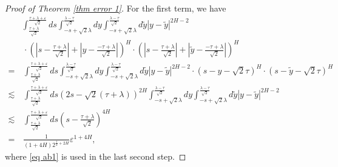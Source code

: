 \documentclass[11pt,reqno]{amsart}
\numberwithin{equation}{section}
\newcommand{\1}{{\bf 1}}
\newcommand{\2}{{\bf 2}}
\begin{document}
\begin{proof}[Proof of Theorem \ref{thm error 1}]
For the first term, we have
\begin{align*}
 & \int_{\frac{\tau+\lambda}{\sqrt 2} }^ \frac{\tau+\lambda+\varepsilon}{\sqrt 2}ds   \int_{-s + \sqrt{2}\lambda}^{\frac{\lambda-\tau}{\sqrt 2} } dy \int_{-s + \sqrt{2}\lambda}^{\frac{\lambda-\tau}{\sqrt 2} } d\tilde{y} 
  |y - \tilde{y}|^{2H-2} \\
  &\, \cdot \left( \left|s - \frac{\tau+\lambda}{\sqrt{2}} \right| + \left| y - \frac{-\tau+\lambda}{\sqrt{2}} \right| \right)^{H} 
  \cdot \left( \left| s - \frac{\tau+\lambda}{\sqrt{2}} \right| + \left| \tilde y - \frac{-\tau+\lambda}{\sqrt{2}} \right| \right)^{H}\\
   =&\,  \int_{\frac{\tau+\lambda}{\sqrt 2} }^ \frac{\tau+\lambda+\varepsilon}{\sqrt 2}ds   \int_{-s+ \sqrt{2}\lambda}^{\frac{\lambda-\tau}{\sqrt 2} } dy \int_{-s + \sqrt{2}\lambda}^{\frac{\lambda-\tau}{\sqrt 2} } d\tilde{y} 
  |y - \tilde{y}|^{2H-2}  \cdot \left(s- y-\sqrt{2}\tau  \right)^{H}  \cdot \left(  s- \tilde y-\sqrt{2}\tau  \right)^{H} \\
     \lesssim  &\,    \int_{\frac{\tau+\lambda}{\sqrt 2} }^ \frac{\tau+\lambda+\varepsilon}{\sqrt 2}ds  \left (2s-\sqrt{2}(\tau+\lambda)\right)^{2H}     \int_{-s + \sqrt{2}\lambda}^{\frac{\lambda-\tau}{\sqrt 2} } dy \int_{-s + \sqrt{2}\lambda}^{\frac{\lambda-\tau}{\sqrt 2} } d\tilde{y}
  |y - \tilde{y}|^{2H-2}  \\
  \lesssim &\,   \int_{\frac{\tau+\lambda}{\sqrt 2} }^ \frac{\tau+\lambda+\varepsilon}{\sqrt 2}ds  \left ( s- \frac{\tau+\lambda}{\sqrt{2}}\right)^{4H}  \\
=&\, \frac{1}{(1+4H) 2^{\frac12+2H}}   \varepsilon^{1+4H},
 \end{align*}
where     \eqref{eq ab1} is used  in the   last  second step. 



\end{proof}
\end{document}
